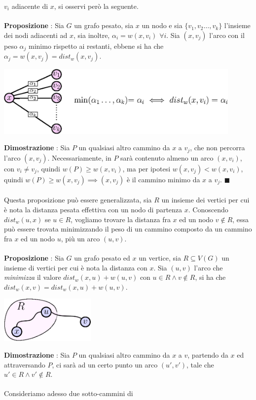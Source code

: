 \documentclass[12pt, letterpaper]{article}
\newcommand{\acc}{\\\hphantom{}\\}
\begin{document}
$v_i$ adiacente di $x$, si osservi però la seguente.\acc
\textbf{Proposizione} : Sia $G$ un grafo pesato, sia $x$ un nodo e sia $\{v_1,v_2\dots,v_k\}$ l'insieme dei nodi adiacenti
ad $x$, sia inoltre, $\alpha_i=w(x,v_i)$ $\forall i$. Sia $(x,v_j)$ l'arco con il peso $\alpha_j$ minimo rispetto
ai restanti, ebbene si ha che $\alpha_j=w(x,v_j)=dist_w(x,v_j)$. \begin{center}
    \includegraphics[width=0.9\textwidth ]{images/distNodiVicini.eps}
\end{center}
\textbf{Dimostrazione} : Sia $P$ un qualsiasi altro cammino da $x$ a $v_j$, che non percorra l'arco
$(x,v_j)$. Necessariamente, in $P$ sarà contenuto almeno un arco $(x,v_i)$, con $v_i\ne v_j$, quindi
$w(P)\ge w(x,v_i)$, ma per ipotesi $w(x,v_j)<w(x,v_i)$, quindi $w(P)\ge w(x,v_j)\implies(x,v_j)$ è il cammino minimo
da $x$ a $v_j$. $\blacksquare$\acc
Questa proposizione può essere generalizzata, sia $R$ un insieme dei vertici per cui è nota la distanza pesata effettiva con un
nodo di partenza $x$. Conoscendo $dist_w(u,x)$ se $u\in R$, vogliamo trovare la distanza fra $x$ ed un nodo $v\notin R$,
essa può essere trovata minimizzando il peso di un cammino composto da un cammino fra $x$ ed un nodo $u$, più un arco
$(u,v)$.\acc
\textbf{Proposizione} : Sia $G$ un grafo pesato ed $x$ un vertice, sia $R\subseteq V(G)$ un insieme di vertici per cui
è nota la distanza con $x$. Sia $(u,v)$ l'arco che \textit{minimizza} il valore $dist_w(x,u)+w(u,v)$ con $u\in R \land v\notin R$,
si ha che $dist_w(x,v)=dist_w(x,u)+w(u,v)$.\begin{center}
    \includegraphics[width=0.35\textwidth ]{images/insiemeR.eps}
\end{center}
\textbf{Dimostrazione} : Sia $P$ un qualsiasi altro cammino da $x$ a $v$, partendo da $x$ ed attraversando $P$, ci
sarà ad un certo punto un arco $(u',v')$, tale che $u'\in R\land v'\notin R$. \acc Consideriamo adesso due sotto-cammini di
\end{document}
